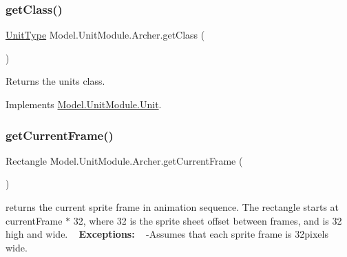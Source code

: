 \hypertarget{class_model_1_1_unit_module_1_1_archer_a2211d99610a907939dac87cb75c3afb1}{}\label{class_model_1_1_unit_module_1_1_archer_a2211d99610a907939dac87cb75c3afb1} 
\subsubsection{\texorpdfstring{get\+Class()}{getClass()}}
{\footnotesize\ttfamily \hyperlink{namespace_model_1_1_unit_module_aba9769f408747bf38d0d8adca8f68c98}{Unit\+Type} Model.\+Unit\+Module.\+Archer.\+get\+Class (\begin{DoxyParamCaption}{ }\end{DoxyParamCaption})\hspace{0.3cm}{\ttfamily [inline]}}

Returns the unit\textquotesingle{}s class. 

Implements \hyperlink{interface_model_1_1_unit_module_1_1_unit_a84dbb2982a68ec530e53662d747da9fa}{Model.\+Unit\+Module.\+Unit}.

\hypertarget{class_model_1_1_unit_module_1_1_archer_ac116699a7276c0549d2be5c3998d8813}{}\label{class_model_1_1_unit_module_1_1_archer_ac116699a7276c0549d2be5c3998d8813} 
\subsubsection{\texorpdfstring{get\+Current\+Frame()}{getCurrentFrame()}}
{\footnotesize\ttfamily Rectangle Model.\+Unit\+Module.\+Archer.\+get\+Current\+Frame (\begin{DoxyParamCaption}{ }\end{DoxyParamCaption})\hspace{0.3cm}{\ttfamily [inline]}}

returns the current sprite frame in animation sequence. The rectangle starts at current\+Frame $\ast$ 32, where 32 is the sprite sheet offset between frames, and is 32 high and wide. ~\newline
 {\bfseries Exceptions\+:} ~\newline
 -\/\+Assumes that each sprite frame is 32pixels wide. 

